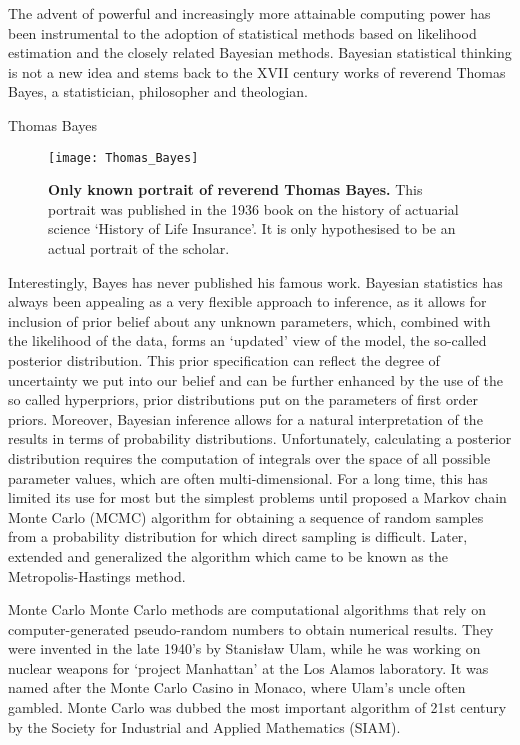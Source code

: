 The advent of powerful and increasingly more attainable computing power has been instrumental to the adoption of statistical methods based on likelihood estimation and the closely related Bayesian methods.
Bayesian statistical thinking is not a new idea and stems back to the XVII century works of reverend Thomas Bayes, a statistician, philosopher and theologian. 

\clearpage

\begin{remark}{Thomas Bayes}
\begin{figure}[h!]
\centering
\texttt{[image: Thomas\_Bayes]} 
\caption{
{ \footnotesize 
{\bf Only known portrait of reverend Thomas Bayes.} This portrait was published in the 1936 book on the history of actuarial science `History of Life Insurance'. It is only hypothesised to be an actual portrait of the scholar.
}%
}
\label{fig:bayes}
\end{figure}
\end{remark}

Interestingly, Bayes has never published his famous work.
Bayesian statistics has always been appealing as a very flexible approach to inference, as it allows for inclusion of prior belief about any unknown parameters, which, combined with the likelihood of the data, forms an `updated' view of the model, the so-called posterior distribution.
This prior specification can reflect the degree of uncertainty we put into our belief and can be further enhanced by the use of the so called hyperpriors, prior distributions put on the parameters of first order priors.
Moreover, Bayesian inference allows for a natural interpretation of the results in terms of probability distributions. 
Unfortunately, calculating a posterior distribution requires the computation of integrals over the space of all possible parameter values, which are often multi-dimensional.
For a long time, this has limited its use for most but the simplest problems until \cite{Metropolis1953} proposed a Markov chain Monte Carlo (MCMC) algorithm for obtaining a sequence of random samples from a probability distribution for which direct sampling is difficult. 
Later, \cite{Hasting1970} extended and generalized the algorithm which came to be known as the Metropolis-Hastings method.

\begin{remark}{Monte Carlo}
Monte Carlo methods are computational algorithms that rely on computer-generated pseudo-random numbers to obtain numerical results. 
They were invented in the late 1940's by Stanis\l{}aw Ulam, while he was working on nuclear weapons for `project Manhattan'
at the Los Alamos laboratory.  
It was named after the Monte Carlo Casino in Monaco, where Ulam's uncle often gambled.
Monte Carlo was dubbed the most important algorithm of 21st century by the Society for Industrial and Applied Mathematics (SIAM).
\end{remark}


